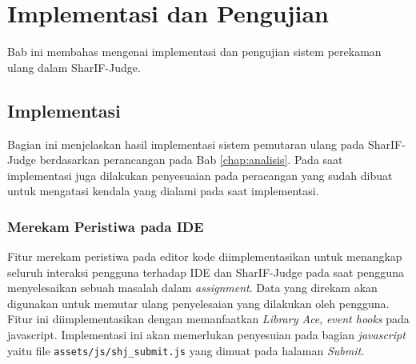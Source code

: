 \chapter{Implementasi dan Pengujian}
\label{chap:implementasidanpengujian}

Bab ini membahas mengenai implementasi dan pengujian sistem perekaman ulang dalam SharIF-Judge.

\section{Implementasi}
\label{sec:5:implementasi}

Bagian ini menjelaskan hasil implementasi sistem pemutaran ulang pada SharIF-Judge berdasarkan perancangan pada Bab \ref{chap:analisis}. Pada saat implementasi juga dilakukan penyesuaian pada peracangan yang sudah dibuat untuk mengatasi kendala yang dialami pada saat implementasi. 

\subsection{Merekam Peristiwa pada IDE}
\label{sub:5:2:merekam}

Fitur merekam peristiwa pada editor kode diimplementasikan untuk menangkap seluruh interaksi pengguna terhadap IDE dan SharIF-Judge pada saat pengguna menyelesaikan sebuah masalah dalam \textit{assignment}. Data yang direkam akan digunakan untuk memutar ulang penyelesaian yang dilakukan oleh pengguna. Fitur ini diimplementasikan dengan memanfaatkan \textit{Library Ace}, \textit{event hooks} pada javascript. Implementasi ini akan memerlukan penyesuian pada bagian \textit{javascript} yaitu file \verb|assets/js/shj_submit.js| yang dimuat pada halaman \textit{Submit}.

